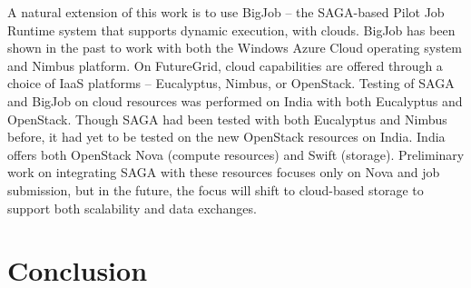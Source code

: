\documentclass[]{paper}
\begin{document}
A natural extension of this work is to use BigJob -- the SAGA-based Pilot Job Runtime system that supports dynamic execution, with clouds. BigJob has been shown in the past to work with both the Windows Azure Cloud operating system and Nimbus platform. On FutureGrid, cloud capabilities are offered through a choice of IaaS platforms -- Eucalyptus, Nimbus, or OpenStack. Testing of SAGA and BigJob on cloud resources was performed on India with both Eucalyptus and OpenStack. Though SAGA had been tested with both Eucalyptus and Nimbus before, it had yet to be tested on the new OpenStack resources on India. India offers both OpenStack Nova (compute resources) and Swift (storage). Preliminary work on integrating SAGA with these resources focuses only on Nova and job submission, but in the future, the focus will shift to cloud-based storage to support both scalability and data exchanges.




\section{Conclusion}
\end{document}
